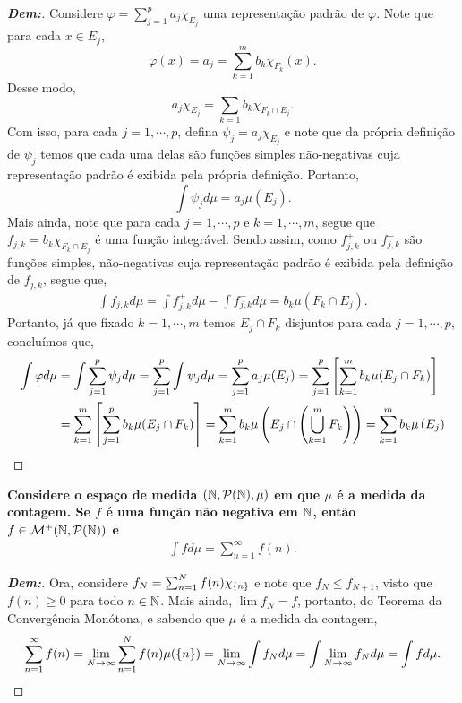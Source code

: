 \begin{proof}[\textbf{Dem:}]
  Considere $\varphi = \sum_{j = 1}^p a_j \chi_{E_j}$ uma representação padrão de $\varphi$. Note que 
  para cada $x \in E_j$, 
  $$\varphi(x) = a_j = \sum_{k=1}^m b_k \chi_{F_k} (x).$$
  Desse modo, 
  $$a_j \chi_{E_j} = \sum_{k=1} b_k \chi_{F_k \cap E_j}.$$
  Com isso, para cada $j = 1, \cdots, p$, defina $\psi_j = a_j \chi_{E_j}$ e note que da própria 
  definição de $\psi_j$ temos que cada uma delas são funções simples não-negativas cuja 
  representação padrão é exibida pela própria definição. Portanto, 
  $$\int \psi_j d\mu = a_j \mu(E_j).$$
  Mais ainda, note que para cada $j = 1, \cdots, p$ e $k = 1, \cdots, m$, segue que 
  $f_{j, k} = b_k \chi_{F_k \cap E_j}$ é uma função integrável. Sendo assim, 
  como $f_{j, k}^+$ ou $f_{j, k}^-$ são funções simples, não-negativas cuja representação 
  padrão é exibida pela definição de $f_{j, k}$, segue que,
  \begin{align*}
    \int f_{j, k} d\mu = \int f_{j, k}^+ d\mu - \int f_{j, k}^- d\mu = b_k \mu(F_k \cap E_j).
  \end{align*}
  Portanto, já que fixado $k = 1, \cdots, m$ temos $E_j \cap F_k$ disjuntos para cada $j = 1, \cdots, p$,
  concluímos que,
  \begin{align*}
    \int \varphi d\mu &= \int \sum_{j=1}^p \psi_j d\mu = \sum_{j=1}^p \int \psi_j d\mu 
    = \sum_{j=1}^p a_j \mu(E_j) = \sum_{j=1}^p \left[\sum_{k=1}^m b_k \mu(E_j \cap F_k)\right]\\
    &= \sum_{k=1}^m \left[\sum_{j=1}^p b_k \mu(E_j \cap F_k)\right]
    = \sum_{k=1}^m b_k \mu\left(E_j \cap \left(\bigcup_{k=1}^m F_k\right)\right)
    = \sum_{k=1}^m b_k \mu\left(E_j\right)
  \end{align*}
\end{proof}
\biglinend
\newpage
{}
\myexe{\thetres}
\bigline
\textbf{Considere o espaço de medida $(\mathbb N, \mathcal P(\mathbb N), \mu)$ em que $\mu$
é a medida da contagem. Se $f$ é uma função não negativa em $\mathbb N$, 
então $f \in \mathcal M^+(\mathbb N, \mathcal P(\mathbb N))$ e 
\begin{align*}
  \int f d\mu = \sum_{n=1}^\infty f(n).
\end{align*}}
\begin{proof}[\textbf{Dem:}]
  Ora, considere $f_N = \sum_{n=1}^N f(n) \chi_{\left\{n\right\}}$ e note que $f_N \le f_{N+1}$, visto que $f(n) \ge 0$ para 
  todo $n \in \mathbb N$. Mais ainda, $\lim f_N = f$, portanto, do Teorema da Convergência Monótona, 
  e sabendo que $\mu$ é a medida da contagem,
  \begin{align*}
    \sum_{n = 1}^\infty f(n) = \lim_{N \rightarrow \infty} \sum_{n=1}^N f(n)\mu(\left\{n\right\}) 
    = \lim_{N\rightarrow \infty} \int f_N d\mu = \int \lim_{N \rightarrow \infty} f_N d\mu 
    = \int f d\mu.
  \end{align*}
\end{proof}
